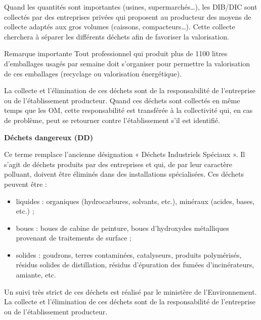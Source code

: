 \vspace{0.3cm}

Quand les quantités sont importantes (usines, supermarchés…), les DIB/DIC sont collectés par des entreprises privées qui proposent au producteur des moyens de collecte adaptés aux gros volumes (caissons, compacteurs…). Cette collecte cherchera à séparer les différents déchets afin de favoriser la valorisation.
\vspace{0.3cm}

Remarque importante
Tout professionnel qui produit plus de 1100 litres d’emballages usagés par semaine doit s’organiser pour permettre la valorisation de ces emballages (recyclage ou valorisation énergétique).

\vspace{0.3cm}

La collecte et l’élimination de ces déchets sont de la responsabilité de l’entreprise ou de l’établissement producteur. Quand ces déchets sont collectés en même temps que les OM, cette responsabilité est transférée à la collectivité qui, en cas de problème, peut se retourner contre l’établissement s’il est identifié.
\vspace{0.3cm}

\vspace{0.3cm}
\textbf{Déchets dangereux (DD)}
\vspace{0.3cm}

Ce terme remplace l’ancienne désignation « Déchets Industriels Spéciaux ». Il s’agit de déchets produits par des entreprises et qui, de par leur caractère polluant, doivent être éliminés dans des installations spécialisées.
Ces déchets peuvent être :

\begin{itemize}
\item liquides : organiques (hydrocarbures, solvants, etc.), minéraux (acides, bases, etc.) ;
\item boues : boues de cabine de peinture, boues d'hydroxydes métalliques provenant de traitements de surface ;
\item solides : goudrons, terres contaminées, catalyseurs, produits polymérisés, résidus solides de distillation, résidus d'épuration des fumées d'incinérateurs, amiante, etc.
\end{itemize}

Un suivi très strict de ces déchets est réalisé par le ministère de l’Environnement.
La collecte et l’élimination de ces déchets sont de la responsabilité de l’entreprise ou de l’établissement producteur.

